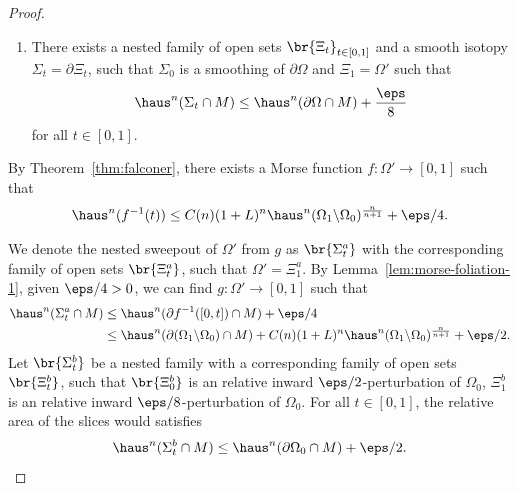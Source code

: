 \begin{lemma}
\begin{proof}
\begin{enumerate}
            \item[(b)] There exists a nested family of open sets $\br{\Xi_t}_{t \in [0, 1]}$ and a smooth isotopy $\Sigma_t = \partial\Xi_t$, such that $\Sigma_0$ is a smoothing of $\partial\Omega$ and $\Xi_1 = \Omega'$ such that 
            \begin{equation*}
                \haus^n(\Sigma_t\cap M) \leq \haus^n(\partial\Omega \cap M) + \frac{\eps}{8}
            \end{equation*}
            for all $t \in [0, 1]$. 
        \end{enumerate}
        By Theorem~\ref{thm:falconer}, there exists a Morse function $f: \Omega' \to [0, 1]$ such that
        \begin{equation*}
        \begin{split}
            \haus^n(f^{-1}(t)) \leq C(n)(1 + L)^n\haus^n(\Omega_1\backslash\Omega_0)^{\frac{n}{n + 1}} + \eps/4. 
        \end{split}
        \end{equation*}

        We denote the nested sweepout of $\Omega'$ from $g$ as $\br{\Sigma_t^a}$ with the corresponding family of open sets $\br{\Xi_t^a}$, such that $\Omega' = \Xi_1^a$. By Lemma~\ref{lem:morse-foliation-1}, given $\eps/4 > 0$, we can find $g: \Omega' \to [0, 1]$ such that 
        \begin{equation}\label{eq:sigma-a-t}
            \begin{split}
                \haus^n(\Sigma_t^a\cap M) &\leq \haus^n(\partial f^{-1}([0, t])\cap M) + \eps/4\\
                &\leq \haus^n(\partial(\Omega_1\backslash\Omega_0)\cap M) + C(n)(1 + L)^n\haus^n(\Omega_1\backslash\Omega_0)^{\frac{n}{n + 1}} + \eps/2.  
            \end{split}
        \end{equation}
        Let $\br{\Sigma_t^b}$ be a nested family with a corresponding family of open sets $\br{\Xi_t^b}$, such that $\br{\Xi_0^b}$ is an relative inward $\eps/2$-perturbation of $\Omega_0$, $\Xi_1^b$ is an relative inward $\eps/8$-perturbation of $\Omega_0$. For all $t \in [0, 1]$, the relative area of the slices would satisfies
        \begin{equation}\label{eq:sigma-b-t}
            \haus^n(\Sigma_t^b\cap M) \leq \haus^n(\partial\Omega_0\cap M) + \eps/2.
        \end{equation}


\end{proof}
\end{lemma}
